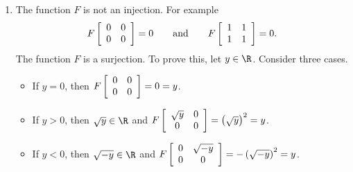 \begin{enumerate}
\begin{enumerate}
\item The function $F$ is not an injection.  For example
\[
F \left[ {\begin{array}{*{20}c}
   0 & 0  \\
   0 & 0  \\
\end{array} } \right] =  0 \qquad \text{and} \qquad
F \left[ {\begin{array}{*{20}c}
   1 & 1  \\
   1 & 1  \\
\end{array} } \right] =  0.
\]
The function $F$ is a surjection.  To prove this, let $y \in \R$.  Consider three cases.
\begin{itemize}
\item If $y = 0$, then $F \left[ {\begin{array}{*{20}c}
   0 & 0  \\
   0 & 0  \\
\end{array} } \right] =  0 = y$.

\item If $y > 0$, then $\sqrt{y} \in \R$ and $F \left[ {\begin{array}{*{20}c}
   \sqrt{y} & 0  \\
   0 & 0  \\
\end{array} } \right] =  \left( \sqrt{y} \right)^2 = y$.

\item If $y < 0$, then $\sqrt{-y} \in \R$ and $F \left[ {\begin{array}{*{20}c}
   0 & \sqrt{-y}  \\
   0 & 0  \\
\end{array} } \right] =  -\left( \sqrt{-y} \right)^2 = y$.

\end{itemize}

\end{enumerate}

\end{enumerate}
\hbreak
\endinput
